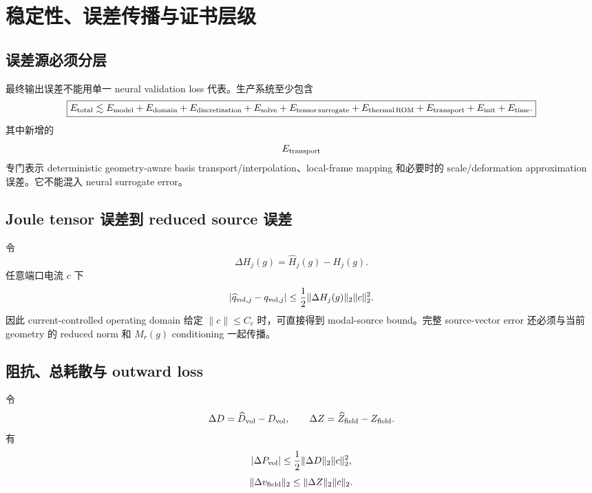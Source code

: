\section{稳定性、误差传播与证书层级}

\subsection{误差源必须分层}
最终输出误差不能用单一 neural validation loss 代表。生产系统至少包含
\begin{equation}
\boxed{
E_{\rm total}
\lesssim
E_{\rm model}+E_{\rm domain}+E_{\rm discretization}+E_{\rm solve}
+E_{\rm tensor\,surrogate}+E_{\rm thermal\,ROM}+E_{\rm transport}
+E_{\rm init}+E_{\rm time}.
}
\end{equation}
其中新增的
\begin{equation}
E_{\rm transport}
\end{equation}
专门表示 deterministic geometry-aware basis transport/interpolation、local-frame mapping 和必要时的 scale/deformation approximation 误差。它不能混入 neural surrogate error。

\subsection{Joule tensor 误差到 reduced source 误差}
令
\begin{equation}
\Delta H_j(g)=\widehat H_j(g)-H_j(g).
\end{equation}
任意端口电流 $c$ 下
\begin{equation}
\left|\widehat q_{{\rm vol},j}-q_{{\rm vol},j}\right|
\le\frac12\|\Delta H_j(g)\|_2\|c\|_2^2.
\end{equation}
因此 current-controlled operating domain 给定 $\|c\|\le C_c$ 时，可直接得到 modal-source bound。完整 source-vector error 还必须与当前 geometry 的 reduced norm 和 $M_r(g)$ conditioning 一起传播。

\subsection{阻抗、总耗散与 outward loss}
令
\begin{equation}
\Delta D=\widehat D_{\rm vol}-D_{\rm vol},
\qquad
\Delta Z=\widehat Z_{\rm field}-Z_{\rm field}.
\end{equation}
有
\begin{equation}
|\Delta P_{\rm vol}|\le\frac12\|\Delta D\|_2\|c\|_2^2,
\end{equation}
\begin{equation}
\|\Delta v_{\rm field}\|_2\le\|\Delta Z\|_2\|c\|_2.
\end{equation}

